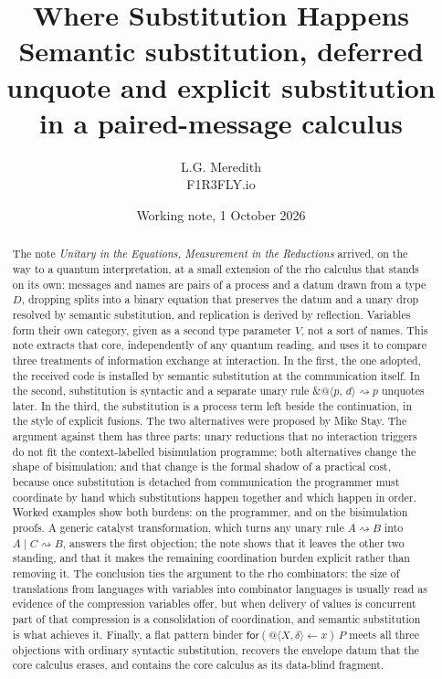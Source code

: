 \documentclass[11pt,a4paper]{article}
\title{Where Substitution Happens\\[0.4em]
\large Semantic substitution, deferred unquote and explicit substitution\\
in a paired-message \rhoc{} calculus}
\author{L.G. Meredith\\ F1R3FLY.io}
\date{Working note, 1 October 2026}
\makeatletter
\theoremstyle{plain}
\theoremstyle{definition}
\theoremstyle{remark}
\newcommand{\rhoc}{\textsf{rho}}
\newcommand{\qn}[2]{@\langle #1,\,#2\rangle}
\newcommand{\rcv}[3]{\mathsf{for}(#1 \leftarrow #2)\,#3}
\newcommand{\unq}[1]{\mathop{\&}#1}
\newcommand{\red}{\rightsquigarrow}
\makeatother
\begin{document}
\maketitle

\begin{abstract}
The note \emph{Unitary in the Equations, Measurement in the Reductions}
\cite{UE} arrived, on the way to a quantum interpretation, at a small
extension of the \rhoc{} calculus that stands on its own: messages and names
are pairs of a process and a datum drawn from a type $D$, dropping splits into
a binary equation that preserves the datum and a unary drop resolved by
semantic substitution, and replication is derived by reflection. Variables
form their own category, given as a second type parameter $V$, not a
sort of names. This note
extracts that core, independently of any quantum reading, and uses it to
compare three treatments of information exchange at interaction. In the first,
the one adopted, the received code is installed by semantic substitution at
the communication itself. In the second, substitution is syntactic and a
separate unary rule $\unq{\qn{p}{d}}\red p$ unquotes later. In the third, the
substitution is a process term left beside the continuation, in the style of
explicit fusions. The two alternatives were proposed by Mike Stay. The
argument against them has three parts: unary reductions that no interaction
triggers do not fit the context-labelled bisimulation programme; both
alternatives change the shape of bisimulation; and that change is the formal
shadow of a practical cost, because once substitution is detached from
communication the programmer must coordinate by hand which substitutions
happen together and which happen in order. Worked examples show both burdens:
on the programmer, and on the bisimulation proofs. A generic catalyst
transformation, which turns any unary rule $A\red B$ into $A\mid C\red B$,
answers the first objection; the note shows that it leaves the other two
standing, and that it makes the remaining coordination burden explicit rather
than removing it. The conclusion ties the argument to the rho combinators:
the size of translations from languages with variables into combinator
languages is usually read as evidence of the compression variables offer, but
when delivery of values is concurrent part of that compression is a
consolidation of coordination, and semantic substitution is what achieves it.
Finally, a flat pattern binder $\rcv{@\langle X,\delta\rangle}{x}{P}$ meets
all three objections with ordinary syntactic substitution, recovers the
envelope datum that the core calculus erases, and contains the core calculus
as its data-blind fragment.
\end{abstract}
\end{document}
